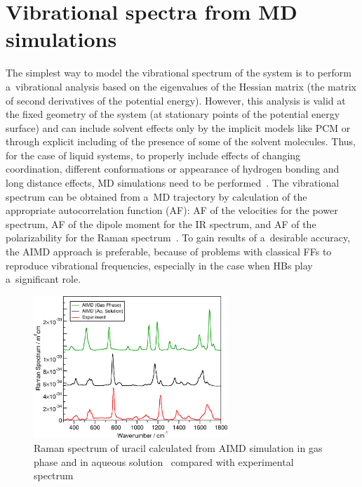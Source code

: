 \section{Vibrational spectra from MD simulations}
\label{sec:vibrational_spectra_from_AIMD}

The simplest way to model the vibrational spectrum of the system is to perform a~vibrational analysis based on the eigenvalues of the Hessian matrix (the matrix of second derivatives of the potential energy). However, this analysis is valid at the fixed geometry of the system (at stationary points of the potential energy surface) and can include solvent effects only by the implicit models like PCM or through explicit including of the presence of some of the solvent molecules. Thus, for the case of liquid systems, to properly include effects of changing coordination, different conformations or appearance of hydrogen bonding and long distance effects, MD simulations need to be performed~\cite{aimd-spectra-review}. The vibrational spectrum can be obtained from a~MD trajectory by calculation of the appropriate autocorrelation function (AF): AF of the velocities for the power spectrum, AF of the dipole moment for the IR spectrum, and AF of the polarizability for the Raman spectrum~\cite{aimd-kirchner}. To gain results of a~desirable accuracy, the AIMD approach is preferable, because of problems with classical FFs to reproduce vibrational frequencies, especially in the case when HBs play a~significant role.

\begin{figure}[ht]
    \centering
    \includegraphics[width=0.65\textwidth]{img/1-introduction/raman-example.png}
    \caption{Raman spectrum of uracil calculated from AIMD simulation in gas phase and in aqueous solution~\cite{aimd-spectrum-5} compared with experimental spectrum~\cite{aimd-spectrum-8}}
    \label{fig:introduction-raman-example}
\end{figure}

